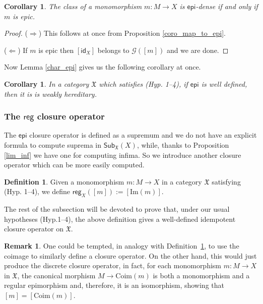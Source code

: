 \documentclass[12pt]{article}
\newtheorem{corollary}[lemma]{Corollary}
\theoremstyle{definition}
\newtheorem{definition}[lemma]{Definition}
\newtheorem{remark}[lemma]{Remark}
\def\X{\mathfrak X}
\def\Coim{\mathrm{Coim}}
\numberwithin{equation}{section}
\newcommand{\catname}[1]{\mathbf{#1}}
\newcommand{\im}[1]{\mathrm{Im}(#1)}
\newcommand{\sub}[1]{\mathsf{Sub}_{\catname{#1}}}
\newcommand{\id}[1]{\mathsf{id}_{#1}}
\def\epi{\mathsf{epi}}
\def\reg{\mathsf{reg}}
\begin{document}
\begin{corollary}
	The class of a monomorphism $m:M\rightarrow X$ is $\epi$-dense if and only if $m$ is epic.
\end{corollary}
\begin{proof}
	($\Rightarrow$) This follows at once from Proposition \ref{coro_map_to_epi}.
	
	\smallskip \noindent
	($\Leftarrow$) If $m$ is epic then $[\id{X}]$ belongs to $\mathcal{G}([m])$ and we are done.
\end{proof}
Now Lemma \ref{char_epi} gives us the following corollary at once.
\begin{corollary}\label{wh}
	In a category $\X$ which satisfies (Hyp. 1--4), if $\epi$ is well defined, then it is is weakly hereditary.
\end{corollary}


\subsubsection{The $\mathsf{reg}$ closure operator}

The $\epi$ closure operator is defined as a supremum and we do not have an explicit formula to compute suprema in $\sub{\X}(X)$, while, thanks to Proposition \ref{lim_inf} we have one for computing infima. So we introduce another closure operator which can be more easily computed.
\begin{definition}\label{def_reg_locale}
Given a monomorphism $m\colon M\rightarrow X$ in a category $\X$ satisfying (Hyp. 1--4), we define
$\reg_{X}([m]):=[\im{m}]$.
\end{definition}

The rest of the subsection will be devoted to prove that, under our usual hypotheses (Hyp.1--4), the above definition gives a well-defined idempotent closure operator on $\X$.

\begin{remark}
One could be tempted, in analogy with Definition~\ref{def_reg_locale}, to use the coimage to similarly define a closure operator. On the other hand, this would just produce the discrete closure operator, in fact, for each monomorphism $m\colon M\to X$ in $\X$,  the canonical morphism $M\to \Coim(m)$ is both a monomorphism and a regular epimorphism and, therefore, it is an isomorphism, showing that $[m]=[\Coim(m)]$.
\end{remark}


\end{document}
